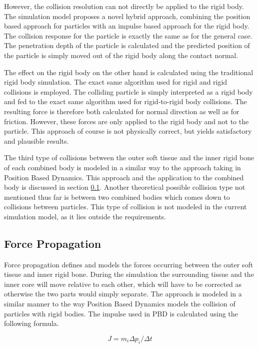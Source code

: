 However, the collision resolution can not directly be applied to the rigid body. The simulation model proposes a novel hybrid approach, combining the position based approach for particles with an impulse based approach for the rigid body. The collision response for the particle is exactly the same as for the general case. The penetration depth of the particle is calculated and the predicted position of the particle is simply moved out of the rigid body along the contact normal.

The effect on the rigid body on the other hand is calculated using the traditional rigid body simulation. The exact same algorithm used for rigid and rigid collisions is employed. The colliding particle is simply interpreted as a rigid body and fed to the exact same algorithm used for rigid-to-rigid body collisions. The resulting force is therefore both calculated for normal direction as well as for friction. However, these forces are only applied to the rigid body and not to the particle. This approach of course is not physically correct, but yields satisfactory and plausible results.

The third type of collisions between the outer soft tissue and the inner rigid bone of each combined body is modeled in a similar way to the approach taking in Position Based Dynamics. This approach and the application to the combined body is discussed in section \ref{subsec:force_propagation}. Another theoretical possible collision type not mentioned thus far is between two combined bodies which comes down to collisions between particles. This type of collision is not modeled in the current simulation model, as it lies outside the requirements.

\subsection{Force Propagation}
\label{subsec:force_propagation}

Force propagation defines and models the forces occurring between the outer soft tissue and inner rigid bone. During the simulation the surrounding tissue and the inner core will move relative to each other, which will have to be corrected as otherwise the two parts would simply separate. The approach is modeled in a similar manner to the way Position Based Dynamics models the collision of particles with rigid bodies. The impulse used in PBD is calculated using the following formula.

\begin{equation}
J = m_i \Delta p_i/\Delta t
\end{equation}

